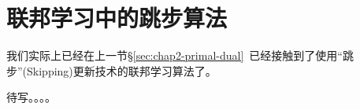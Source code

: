 \section{联邦学习中的跳步算法}
\label{sec:chap2-skip-alg}


我们实际上已经在上一节\S\ref{sec:chap2-primal-dual}~已经接触到了使用``跳步''(Skipping)更新技术的联邦学习算法了。

待写。。。。


